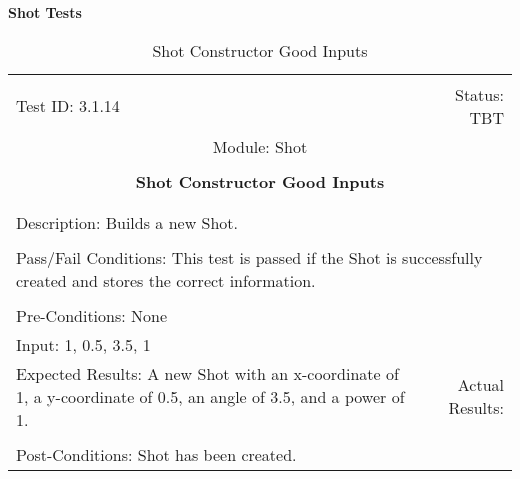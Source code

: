 \documentclass[titlepage]{article}
\begin{document}
\large{\textbf{Shot Tests}}
\begin{center}%
\begin{table}[h!]
\begin{tabular}{|l r|}\hline&\\[-2mm]
	Test ID: 3.1.14	&Status: TBT\\[-3mm]
	\multicolumn{2}{|c|}{Module: Shot}\\&\\
	\multicolumn{2}{|c|}{\textbf{\large{Shot Constructor Good Inputs}}}\\&\\\hline&\\[-3mm]
	\multicolumn{2}{|p{\textwidth}|}{Description: Builds a new Shot.}\\[1mm]\hline&\\[-3mm]
	\multicolumn{2}{|p{\textwidth}|}{Pass/Fail Conditions: This test is passed if the Shot is successfully created and stores the correct information.}\\[1mm]\hline&\\[-3mm]
	\multicolumn{2}{|p{\textwidth}|}{Pre-Conditions: None}\\[4mm]
	\multicolumn{2}{|p{\textwidth}|}{Input: 1, 0.5, 3.5, 1}\\[2mm]\hline
	\multicolumn{1}{|p{0.49\textwidth}}{Expected Results: A new Shot with an x-coordinate of 1, a y-coordinate of 0.5, an angle of 3.5, and a power of 1.}	&\multicolumn{1}{|p{0.45\textwidth}|}{Actual Results: }\\\hline&\\[-3mm]
	\multicolumn{2}{|p{\textwidth}|}{Post-Conditions: Shot has been created.}\\\hline
\end{tabular}
\caption{Shot Constructor Good Inputs}
\end{table}
\end{center}
\end{document}
